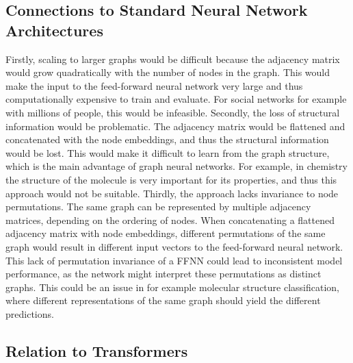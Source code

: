 \documentclass[a4paper]{article}
\begin{document}
\subsection{Connections to Standard Neural Network Architectures}
Firstly, scaling to larger graphs would be difficult because the adjacency matrix would grow quadratically with the
number of nodes in the graph. This would make the input to the feed-forward neural network very large and thus
computationally expensive to train and evaluate. For social networks for example with millions of people, this would
be infeasible.
\newline \newline
Secondly, the loss of structural information would be problematic. The adjacency matrix would be flattened and
concatenated with the node embeddings, and thus the structural information would be lost. This would make it
difficult to learn from the graph structure, which is the main advantage of graph neural networks. For example, in
chemistry the structure of the molecule is very important for its properties, and thus this approach would not be
suitable.
\newline \newline
Thirdly, the approach lacks invariance to node permutations. The same graph can be represented by multiple adjacency
matrices, depending on the ordering of nodes. When concatenating a flattened adjacency matrix with
node embeddings, different permutations of the same graph would result in different input vectors to the feed-forward
neural network. This lack of permutation invariance of a FFNN could lead to inconsistent model performance, as the
network might interpret these permutations as distinct graphs. This could be an issue in for example molecular
structure classification, where different representations of the same graph should yield the different predictions.
\bigskip
\subsection{Relation to Transformers}
\end{document}

